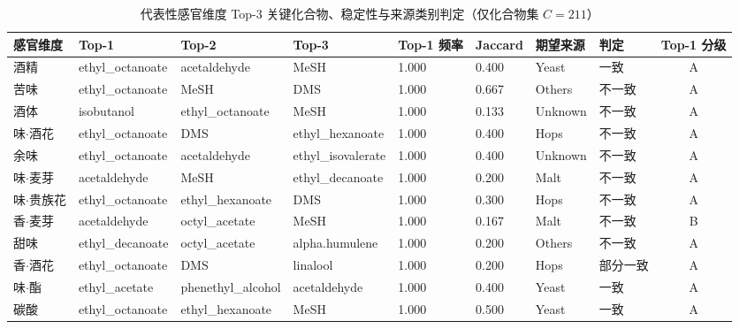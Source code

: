 \documentclass[zihao=-4,a4paper,UTF8,fontset=none]{ctexart}
\begin{document}
\begin{table}[H]
\begin{threeparttable}
\centering
\scriptsize
\caption{代表性感官维度 Top-3 关键化合物、稳定性与来源类别判定（仅化合物集 $C=211$）}
\begin{tabularx}{\textwidth}{@{}p{1.20cm}YYYYYYYc@{}}
\toprule
\textbf{感官维度} & \textbf{Top-1} & \textbf{Top-2} & \textbf{Top-3} & \textbf{Top-1 频率} & \textbf{Jaccard} & \textbf{期望来源} & \textbf{判定} & \textbf{Top-1 分级} \\ \midrule
酒精 & ethyl\_\allowbreak{}octanoate & acetaldehyde & MeSH & 1.000 & 0.400 & Yeast & 一致 & A \\
苦味 & ethyl\_\allowbreak{}octanoate & MeSH & DMS & 1.000 & 0.667 & Others & 不一致 & A \\
酒体 & isobutanol & ethyl\_\allowbreak{}octanoate & MeSH & 1.000 & 0.133 & Unknown & 不一致 & A \\
味$\cdot$酒花 & ethyl\_\allowbreak{}octanoate & DMS & ethyl\_\allowbreak{}hexanoate & 1.000 & 0.400 & Hops & 不一致 & A \\
余味 & ethyl\_\allowbreak{}octanoate & acetaldehyde & ethyl\_\allowbreak{}isovalerate & 1.000 & 0.400 & Unknown & 不一致 & A \\
味$\cdot$麦芽 & acetaldehyde & MeSH & ethyl\_\allowbreak{}decanoate & 1.000 & 0.200 & Malt & 不一致 & A \\
味$\cdot$贵族花 & ethyl\_\allowbreak{}octanoate & ethyl\_\allowbreak{}hexanoate & DMS & 1.000 & 0.300 & Hops & 不一致 & A \\
香$\cdot$麦芽 & acetaldehyde & octyl\_\allowbreak{}acetate & MeSH & 1.000 & 0.167 & Malt & 不一致 & B \\
甜味 & ethyl\_\allowbreak{}decanoate & octyl\_\allowbreak{}acetate & alpha.\allowbreak{}humulene & 1.000 & 0.200 & Others & 不一致 & A \\
香$\cdot$酒花 & ethyl\_\allowbreak{}octanoate & DMS & linalool & 1.000 & 0.200 & Hops & 部分一致 & A \\
味$\cdot$酯 & ethyl\_\allowbreak{}acetate & phenethyl\_\allowbreak{}alcohol & acetaldehyde & 1.000 & 0.400 & Yeast & 一致 & A \\
碳酸 & ethyl\_\allowbreak{}octanoate & ethyl\_\allowbreak{}hexanoate & MeSH & 1.000 & 0.500 & Yeast & 一致 & A \\
\bottomrule
\end{tabularx}
\end{threeparttable}
\end{table}
\end{document}
